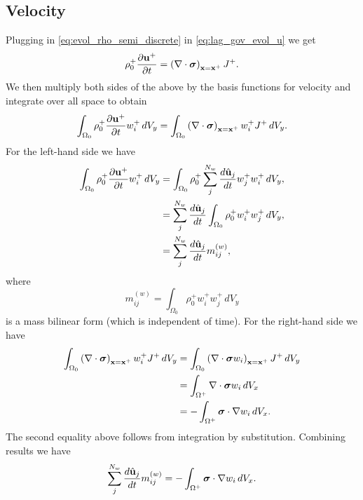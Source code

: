\documentclass[11pt]{article}
\begin{document}
\subsection{Velocity}
Plugging in \cref{eq:evol_rho_semi_discrete} in \cref{eq:lag_gov_evol_u} we get
\begin{equation}
    \rho^+_0 \frac{\partial \mathbf{u}^+}{\partial t} = \left ( \nabla \cdot \bm \sigma \right )_{\mathbf{x} = \mathbf{x}^+} J^+.
\end{equation}
We then multiply both sides of the above by the basis functions for velocity and integrate over all space to obtain
\begin{equation}
    \int_{\Omega_0} \rho^+_0 \frac{\partial \mathbf{u}^+}{\partial t} w^+_i \, dV_y = \int_{\Omega_0} \left ( \nabla \cdot \bm \sigma \right )_{\mathbf{x} = \mathbf{x}^+} w^+_i J^+ \, dV_y.
\end{equation}
For the left-hand side we have
\begin{align}
    \int_{\Omega_0} \rho^+_0 \frac{\partial \mathbf{u}^+}{\partial t} w^+_i \, dV_y &= \int_{\Omega_0} \rho^+_0 \sum_j^{N_w} \frac{d \hat{\mathbf{u}}_j}{dt} w^+_j w^+_i \, dV_y, \nonumber \\
    &= \sum_j^{N_w} \frac{d \hat{\mathbf{u}}_j}{dt} \int_{\Omega_0} \rho^+_0 w^+_i w^+_j \, dV_y, \nonumber \\
    &= \sum_j^{N_w} \frac{d \hat{\mathbf{u}}_j}{dt} m_{ij}^{(w)},
\end{align}
where
\begin{equation}
    m_{ij}^{(w)} = \int_{\Omega_0} \rho^+_0 w^+_i w^+_j \, dV_y
\end{equation}
is a mass bilinear form (which is independent of time). For the right-hand side we have
\begin{align}
    \int_{\Omega_0} \left ( \nabla \cdot \bm \sigma \right )_{\mathbf{x} = \mathbf{x}^+} w^+_i J^+ \, dV_y & = \int_{\Omega_0} \left ( \nabla \cdot \bm \sigma w_i \right )_{\mathbf{x} = \mathbf{x}^+} J^+ \, dV_y \nonumber \\
    & = \int_{\Omega^+} \nabla \cdot \bm \sigma w_i \, dV_x \nonumber \\
    & = -\int_{\Omega^+} \bm \sigma \cdot \nabla w_i \, dV_x.
\end{align}
The second equality above follows from integration by substitution. Combining results we have
\begin{equation}
    \label{eq:evol_u_semi_discrete}
    \sum_j^{N_w} \frac{d \hat{\mathbf{u}}_j}{d t} m^{(w)}_{ij} = -\int_{\Omega^+} \bm \sigma \cdot \nabla w_i \, dV_x.
\end{equation}
\end{document}
